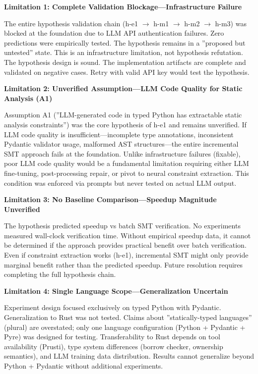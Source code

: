 \textbf{Limitation 1: Complete Validation Blockage---Infrastructure Failure}

The entire hypothesis validation chain (h-e1 $\rightarrow$ h-m1 $\rightarrow$ h-m2 $\rightarrow$ h-m3) was blocked at the foundation due to LLM API authentication failures. Zero predictions were empirically tested. The hypothesis remains in a ''proposed but untested'' state. This is an infrastructure limitation, not hypothesis refutation. The hypothesis design is sound. The implementation artifacts are complete and validated on negative cases. Retry with valid API key would test the hypothesis.

\textbf{Limitation 2: Unverified Assumption---LLM Code Quality for Static Analysis (A1)}

Assumption A1 (''LLM-generated code in typed Python has extractable static analysis constraints'') was the core hypothesis of h-e1 and remains unverified. If LLM code quality is insufficient---incomplete type annotations, inconsistent Pydantic validator usage, malformed AST structures---the entire incremental SMT approach fails at the foundation. Unlike infrastructure failures (fixable), poor LLM code quality would be a fundamental limitation requiring either LLM fine-tuning, post-processing repair, or pivot to neural constraint extraction. This condition was enforced via prompts but never tested on actual LLM output.

\textbf{Limitation 3: No Baseline Comparison---Speedup Magnitude Unverified}

The hypothesis predicted speedup vs batch SMT verification. No experiments measured wall-clock verification time. Without empirical speedup data, it cannot be determined if the approach provides practical benefit over batch verification. Even if constraint extraction works (h-e1), incremental SMT might only provide marginal benefit rather than the predicted speedup. Future resolution requires completing the full hypothesis chain.

\textbf{Limitation 4: Single Language Scope---Generalization Uncertain}

Experiment design focused exclusively on typed Python with Pydantic. Generalization to Rust was not tested. Claims about ''statically-typed languages'' (plural) are overstated; only one language configuration (Python + Pydantic + Pyre) was designed for testing. Transferability to Rust depends on tool availability (Prusti), type system differences (borrow checker, ownership semantics), and LLM training data distribution. Results cannot generalize beyond Python + Pydantic without additional experiments.

